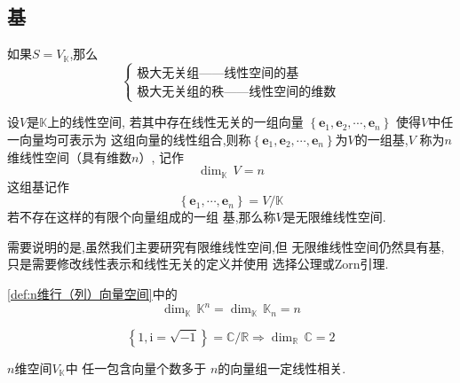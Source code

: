 \subsection{基}
\begin{red}
    \begin{remark}
        如果$S = V_{\mathbb{K}}$,那么
\[
\begin{cases*}
    \text{极大无关组——线性空间的基}
    \\
    \text{极大无关组的秩——线性空间的维数}
\end{cases*}
\]
    \end{remark}
\end{red}
\begin{formal}
\begin{definition}[基]\label{def:基}
    设$V$是$\mathbb{K}$上的线性空间,
    若其中存在线性无关的一组向量
    $\left\{\bm{e}_1,\bm{e}_2
    ,\cdots,\bm{e}_n\right\}$
    使得$V$中任一向量均可表示为
    这组向量的线性组合,则称$\left\{
        \bm{e}_1,\bm{e}_2,\cdots
        ,\bm{e}_n
    \right\}$为$V$的一组基,$V$
    称为$n$维线性空间（具有维数$n$）,
    记作
    \[
    \dim_{\mathbb{K}}\,V = n
    \]
    这组基记作
    \[
    \left\{
        \bm{e}_1,\cdots
        ,\bm{e}_n
    \right\}=
    V /
    \mathbb{K}
    \]
    若不存在这样的有限个向量组成的一组
    基,那么称$V$是无限维线性空间.
\end{definition}
\end{formal}
\begin{red}
\begin{remark}
    需要说明的是,虽然我们主要研究有限维线性空间,但
无限维线性空间仍然具有基,
只是需要修改线性表示和线性无关的定义并使用
选择公理或Zorn引理.
\end{remark}
\end{red}
\begin{brown}
\begin{example}
    \cref{def:n维行（列）向量空间}中的
    \[
    \dim_{\mathbb{K}}\,\mathbb{K}^n
    =\dim_{\mathbb{K}}\,\mathbb{K}_n
    = n
    \]
\end{example}
\end{brown}
\begin{brown}
\begin{example}
    \[
    \left\{1,\mathrm{i} = \sqrt{-1}\right\} = 
    \mathbb{C} /
    \mathbb{R} 
    \Longrightarrow 
    \dim_{\mathbb{R}}\,
    \mathbb{C} = 2
    \]
\end{example}\end{brown}
\begin{green}
\begin{corollary}[超过维数的向量组]\label{cor:超过维数的向量组}
    $n$维空间$V_{\mathbb{K}}$中
    任一包含向量个数多于
    $n$的向量组一定线性相关.
\end{corollary}
\end{green}
